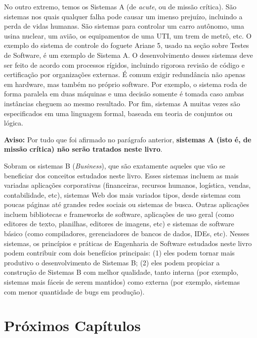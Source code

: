 \documentclass[
  11pt,
  twoside]{book}
\newenvironment{aviso}{\centering \vspace{1.5ex} \begin{tcolorbox}[breakable, colback=backcolor, width=4.9in]}{\end{tcolorbox} \vspace{1.5ex}}
\begin{document}
 No outro extremo, temos os Sistemas A
(de \emph{acute}, ou de missão crítica). São sistemas nos quais qualquer
falha pode causar um imenso prejuízo, incluindo a perda de vidas
humanas. São sistemas para controlar um carro autônomo, uma usina
nuclear, um avião, os equipamentos de uma UTI, um trem de metrô, etc. O
exemplo do sistema de controle do foguete Ariane 5, usado na seção sobre
Testes de Software, é um exemplo de Sistema A. O desenvolvimento desses
sistemas deve ser feito de acordo com processos rígidos, incluindo
rigorosa revisão de código e certificação por organizações externas. É
comum exigir redundância não apenas em hardware, mas também no próprio
software. Por exemplo, o sistema roda de forma paralela em duas máquinas
e uma decisão somente é tomada caso ambas instâncias cheguem ao mesmo
resultado. Por fim, sistemas A muitas vezes são especificados em uma
linguagem formal, baseada em teoria de conjuntos ou lógica.

\begin{aviso}

\textbf{Aviso:} Por tudo que foi afirmado no parágrafo anterior,
\textbf{sistemas A (isto é, de missão crítica) não serão tratados neste
livro}.

\end{aviso}

Sobram os sistemas B (\emph{Business}), que são exatamente aqueles que
vão se beneficiar dos conceitos estudados neste livro. Esses sistemas
incluem as mais variadas aplicações corporativas (financeiras, recursos
humanos, logística, vendas, contabilidade, etc), sistemas Web dos mais
variados tipos, desde sistemas com poucas páginas até grandes redes
sociais ou sistemas de busca. Outras aplicações incluem bibliotecas e
frameworks de software, aplicações de uso geral (como editores de texto,
planilhas, editores de imagens, etc) e sistemas de software básico (como
compiladores, gerenciadores de bancos de dados, IDEs, etc). Nesses
sistemas, os princípios e práticas de Engenharia de Software estudados
neste livro podem contribuir com dois benefícios principais: (1) eles
podem tornar mais produtivo o desenvolvimento de Sistemas B; (2) eles
podem propiciar a construção de Sistemas B com melhor qualidade, tanto
interna (por exemplo, sistemas mais fáceis de serem mantidos) como
externa (por exemplo, sistemas com menor quantidade de bugs em
produção).

\hypertarget{pruxf3ximos-capuxedtulos}{%
\section{Próximos Capítulos}\label{pruxf3ximos-capuxedtulos}}
\end{document}
